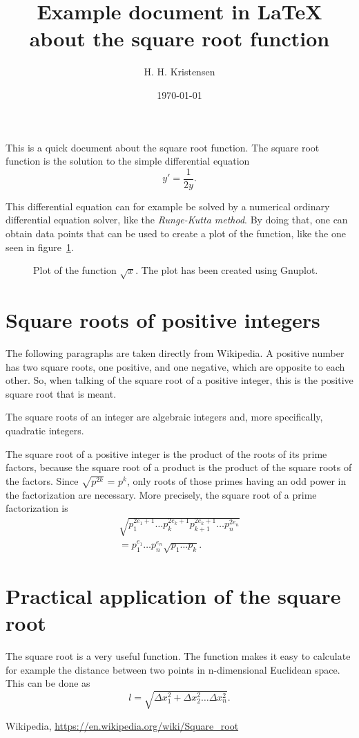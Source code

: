 \documentclass[twocolumn]{article}
\title{Example document in \LaTeX{} about the square root function}
\author{H. H. Kristensen}
\date{\today}
\begin{document}
\maketitle

\noindent This is a quick document about the square root function. The square root function is the solution to the simple differential equation
%
\begin{equation}\label{eq:test}
y' = \frac{1}{2y}.
\end{equation}

This differential equation can for example be solved by a numerical ordinary differential equation solver, like the \emph{Runge-Kutta method}. By doing that, one can obtain data points that can be used to create a plot of the function, like the one seen in figure~\ref{fig:sqrtplot}.


\begin{figure}[h]

\caption{Plot of the function $\sqrt{x}$. The plot has been created using Gnuplot.}
\label{fig:sqrtplot}
\end{figure}

\section{Square roots of positive integers}
The following paragraphs are taken directly from Wikipedia\cite{wiki}. A positive number has two square roots, one positive, and one negative, which are opposite to each other. So, when talking of the square root of a positive integer, this is the positive square root that is meant. 

The square roots of an integer are algebraic integers and, more specifically, quadratic integers.

The square root of a positive integer is the product of the roots of its prime factors, because the square root of a product is the product of the square roots of the factors. Since $\sqrt{p^{2k}}$ = $p^k$, only roots of those primes having an odd power in the factorization are necessary. More precisely, the square root of a prime factorization is 
%
\begin{multline}
\sqrt{p_1^{2e_1 + 1} \dots p_k^{2e_k + 1} p_{k+1}^{2e_k+1} \dots p_n^{2e_n}} \\
= p_1^{e_1} \dots p_n^{e_n} \sqrt{p_1 \dots p_k} .
\end{multline}


\section{Practical application of the square root}

The square root is a very useful function. The function makes it easy to calculate for example the distance between two points in n-dimensional Euclidean space. This can be done as
%
\begin{equation}
l = \sqrt{\Delta x_1^2 + \Delta x_2^2 \dots \Delta x_n^2}.
\end{equation}


\begin{thebibliography}{9}
Wikipedia,
\url{https://en.wikipedia.org/wiki/Square\_root}
\end{thebibliography}
\end{document}
